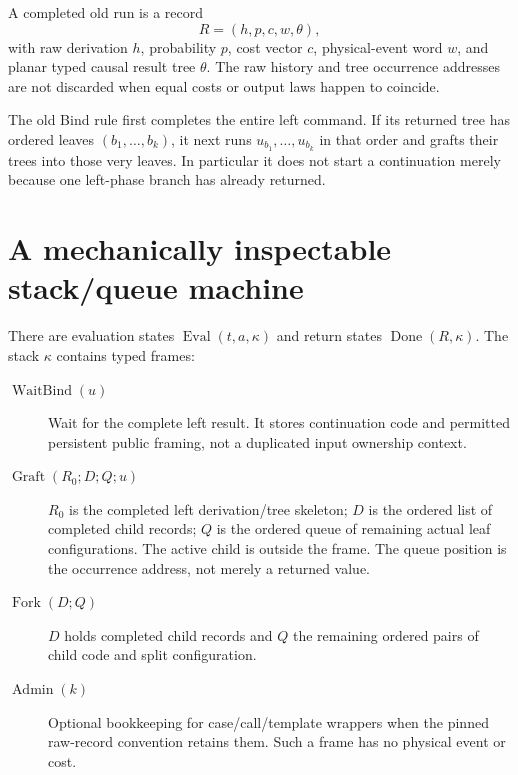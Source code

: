 \documentclass[11pt]{article}
\begin{document}
A completed old run is a record
\[
 R=(h,p,c,w,\theta),
\]
with raw derivation $h$, probability $p$, cost vector $c$, physical-event word $w$, and planar typed causal result tree $\theta$. The raw history and tree occurrence addresses are not discarded when equal costs or output laws happen to coincide.

The old Bind rule first completes the entire left command. If its returned tree has ordered leaves $(b_1,\ldots,b_k)$, it next runs $u_{b_1},\ldots,u_{b_k}$ in that order and grafts their trees into those very leaves. In particular it does not start a continuation merely because one left-phase branch has already returned.

\section{A mechanically inspectable stack/queue machine}
There are evaluation states $\operatorname{Eval}(t,a,\kappa)$ and return states $\operatorname{Done}(R,\kappa)$. The stack $\kappa$ contains typed frames:
\begin{description}
\item[$\operatorname{WaitBind}(u)$] Wait for the complete left result. It stores continuation code and permitted persistent public framing, not a duplicated input ownership context.
\item[$\operatorname{Graft}(R_0;D;Q;u)$] $R_0$ is the completed left derivation/tree skeleton; $D$ is the ordered list of completed child records; $Q$ is the ordered queue of remaining actual leaf configurations. The active child is outside the frame. The queue position is the occurrence address, not merely a returned value.
\item[$\operatorname{Fork}(D;Q)$] $D$ holds completed child records and $Q$ the remaining ordered pairs of child code and split configuration.
\item[$\operatorname{Admin}(k)$] Optional bookkeeping for case/call/template wrappers when the pinned raw-record convention retains them. Such a frame has no physical event or cost.
\end{description}
\end{document}
